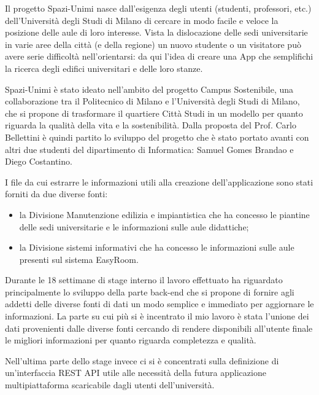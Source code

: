 \documentclass[12pt]{report}
\begin{document}
Il progetto Spazi-Unimi nasce dall’esigenza degli utenti (studenti, professori, etc.) dell’Università degli Studi di Milano di cercare in modo facile e veloce la posizione delle aule di loro interesse. 
Vista la dislocazione delle sedi universitarie in varie aree della città (e della regione) un nuovo studente o un visitatore può avere serie difficoltà nell’orientarsi: da qui l’idea di creare una App che semplifichi la ricerca degli edifici universitari e delle loro stanze. 

Spazi-Unimi è stato ideato nell’ambito del progetto Campus Sostenibile, una collaborazione tra il Politecnico di Milano e l’Università degli Studi di Milano, che si propone di trasformare il quartiere Città Studi in un modello per quanto riguarda la qualità della vita e la sostenibilità.
Dalla proposta del Prof. Carlo Bellettini è quindi partito lo sviluppo del progetto che è stato portato avanti con altri due studenti del dipartimento di Informatica: Samuel Gomes Brandao e Diego Costantino.

\vspace{5mm} %

I file da cui estrarre le informazioni utili alla creazione dell'applicazione sono stati forniti da due diverse fonti:
\begin{itemize}
\item la Divisione Manutenzione edilizia e impiantistica che ha concesso le piantine delle sedi universitarie e le informazioni sulle aule didattiche;
\item la Divisione sistemi informativi che ha concesso le informazioni sulle aule presenti sul sistema EasyRoom.
\end{itemize}

\vspace{5mm} %

Durante le 18 settimane di stage interno il lavoro effettuato ha riguardato principalmente lo sviluppo della parte back-end che si propone di fornire agli addetti delle diverse fonti di dati un modo semplice e immediato per aggiornare le informazioni.
La parte su cui più si è incentrato il mio lavoro è stata l'unione dei dati provenienti dalle diverse fonti cercando di rendere disponibili all'utente finale le migliori informazioni per quanto riguarda completezza e qualità.

Nell'ultima parte dello stage invece ci si è concentrati sulla definizione di un'interfaccia REST API utile alle necessità della futura applicazione multipiattaforma scaricabile dagli utenti dell'università.
\end{document}
